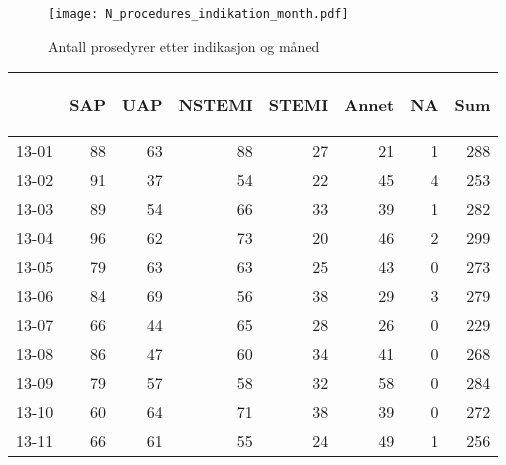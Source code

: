 \documentclass[presentation,xcolor=pdftex,dvipsnames,table]{beamer}
\begin{document}

\begin{frame}
\begin{figure}
  \centering
  \caption{Antall prosedyrer etter indikasjon og måned}
\texttt{[image: N\_procedures\_indikation\_month.pdf]}
\end{figure}\end{frame}


\begin{frame}
\begin{tiny}
\begin{table}[ht]
\centering
\begin{tabular}{rrrrrrrr}
  \toprule
 & \begin{sideways} SAP \end{sideways} & \begin{sideways} UAP \end{sideways} & \begin{sideways} NSTEMI \end{sideways} & \begin{sideways} STEMI \end{sideways} & \begin{sideways} Annet \end{sideways} & \begin{sideways} NA \end{sideways} & \begin{sideways} Sum \end{sideways} \\ 
  \midrule
13-01 & 88 & 63 & 88 & 27 & 21 & 1 & 288 \\ 
  13-02 & 91 & 37 & 54 & 22 & 45 & 4 & 253 \\ 
  13-03 & 89 & 54 & 66 & 33 & 39 & 1 & 282 \\ 
  13-04 & 96 & 62 & 73 & 20 & 46 & 2 & 299 \\ 
  13-05 & 79 & 63 & 63 & 25 & 43 & 0 & 273 \\ 
  13-06 & 84 & 69 & 56 & 38 & 29 & 3 & 279 \\ 
  13-07 & 66 & 44 & 65 & 28 & 26 & 0 & 229 \\ 
  13-08 & 86 & 47 & 60 & 34 & 41 & 0 & 268 \\ 
  13-09 & 79 & 57 & 58 & 32 & 58 & 0 & 284 \\ 
  13-10 & 60 & 64 & 71 & 38 & 39 & 0 & 272 \\ 
  13-11 & 66 & 61 & 55 & 24 & 49 & 1 & 256 \\ 

\end{tabular}
\end{table}
\end{tiny}
\end{frame}
\end{document}
